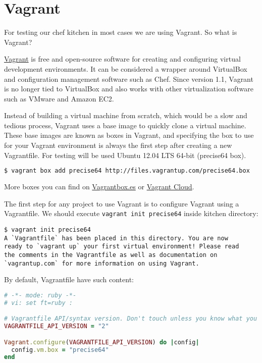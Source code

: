 \section{Vagrant}
\label{sec:solo-vagrant}

For testing our chef kitchen in most cases we are using Vagrant. So what is Vagrant?

\href{http://www.vagrantup.com/}{Vagrant} is free and open-source software for creating and configuring virtual development environments. It can be considered a wrapper around VirtualBox and configuration management software such as Chef. Since version 1.1, Vagrant is no longer tied to VirtualBox and also works with other virtualization software such as VMware and Amazon EC2.

Instead of building a virtual machine from scratch, which would be a slow and tedious process, Vagrant uses a base image to quickly clone a virtual machine. These base images are known as boxes in Vagrant, and specifying the box to use for your Vagrant environment is always the first step after creating a new Vagrantfile. For testing will be used Ubuntu 12.04 LTS 64-bit (precise64 box).

\begin{lstlisting}[language=Bash,label=lst:my-cloud-vagrant1]
$ vagrant box add precise64 http://files.vagrantup.com/precise64.box
\end{lstlisting}

More boxes you can find on \href{http://www.vagrantbox.es/}{Vagrantbox.es} or \href{https://vagrantcloud.com/}{Vagrant Cloud}.

The first step for any project to use Vagrant is to configure Vagrant using a Vagrantfile. We should execute \lstinline!vagrant init precise64! inside kitchen directory:

\begin{lstlisting}[label=lst:my-cloud-vagrant2]
$ vagrant init precise64
A `Vagrantfile` has been placed in this directory. You are now
ready to `vagrant up` your first virtual environment! Please read
the comments in the Vagrantfile as well as documentation on
`vagrantup.com` for more information on using Vagrant.
\end{lstlisting}

By default, Vagrantfile have such content:

\begin{lstlisting}[language=Ruby,label=lst:my-cloud-vagrant3,title=my-cloud/nodes/Vagrantfile]
# -*- mode: ruby -*-
# vi: set ft=ruby :

# Vagrantfile API/syntax version. Don't touch unless you know what you're doing!
VAGRANTFILE_API_VERSION = "2"

Vagrant.configure(VAGRANTFILE_API_VERSION) do |config|
  config.vm.box = "precise64"
end
\end{lstlisting}

